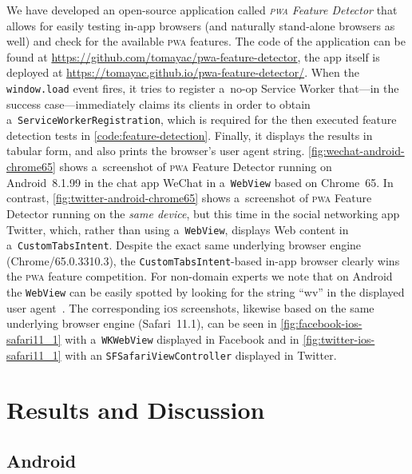 \documentclass[sigconf]{acmart}
\begin{document}
We have developed an open-source application called \emph{\textsc{pwa} Feature Detector}
that allows for easily testing in-app browsers (and naturally stand-alone browsers as well)
and check for the available \textsc{pwa} features.
The code of the application can be found at
\url{https://github.com/tomayac/pwa-feature-detector},
the app itself is deployed at \url{https://tomayac.github.io/pwa-feature-detector/}.
When the \texttt{window.load} event fires,
it tries to register a~no-op Service Worker
that---in the success case---immediately claims its clients
in order to obtain a~\texttt{ServiceWorkerRegistration},
which is required for the then executed feature detection tests
in \autoref{code:feature-detection}.
Finally, it displays the results in tabular form,
and also prints the browser's user agent string.
\autoref{fig:wechat-android-chrome65} shows a~screenshot of \textsc{pwa} Feature Detector
running on Android~8.1.99 in the chat app WeChat in a~\texttt{WebView} based on Chrome~65.
In contrast, \autoref{fig:twitter-android-chrome65} shows
a~screenshot of \textsc{pwa} Feature Detector
running on the \emph{same device}, but this time in the social networking app Twitter,
which, rather than using a~\texttt{WebView},
displays Web content in a~\texttt{CustomTabsIntent}.
Despite the exact same underlying browser engine (Chrome/65.0.3310.3),
the \texttt{CustomTabsIntent}-based in-app browser
clearly wins the \textsc{pwa} feature competition.
For non-domain experts we note that on Android the \texttt{WebView}
can be easily spotted by looking for the string
``wv'' in the displayed user agent~\cite{chrome2018useragent}.
The corresponding i\textsc{os} screenshots, likewise
based on the same underlying browser engine (Safari~11.1),
can be seen in \autoref{fig:facebook-ios-safari11_1} with a~\texttt{WKWebView} displayed in Facebook 
and in \autoref{fig:twitter-ios-safari11_1} with an \texttt{SFSafariViewController}
displayed in Twitter.

\section{Results and Discussion}
\label{sec:results-and-discussion}

\subsection{Android}
\end{document}
